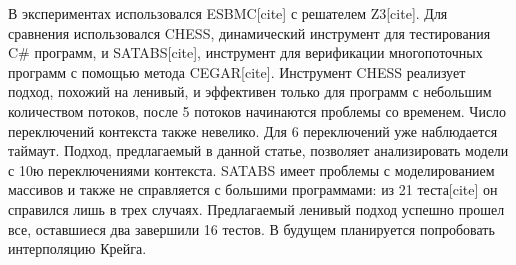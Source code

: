В экспериментах использовался ESBMC[cite] с решателем Z3[cite]. Для сравнения использовался CHESS, динамический инструмент для тестирования C\# программ, и SATABS[cite], инструмент для верификации многопоточных программ с помощью метода CEGAR[cite]. Инструмент CHESS реализует подход, похожий на ленивый, и эффективен только для программ с небольшим количеством потоков, после 5 потоков начинаются проблемы со временем. Число переключений контекста также невелико. Для 6 переключений уже наблюдается таймаут. Подход, предлагаемый в данной статье, позволяет анализировать модели с 10ю переключениями контекста. SATABS имеет проблемы с моделированием массивов и также не справляется с большими программами: из 21 теста[cite] он справился лишь в трех случаях. Предлагаемый ленивый подход успешно прошел все, оставшиеся два завершили 16 тестов.
В будущем планируется попробовать интерполяцию Крейга.

